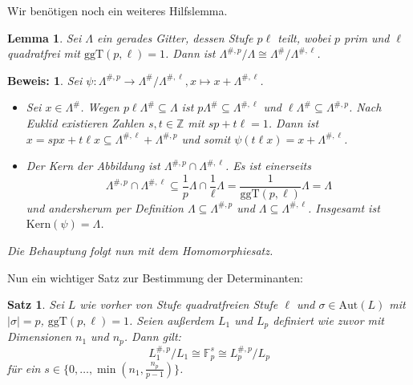 \documentclass[12pt,a4paper,halfparskip,headsepline,bibtotocnumbered]{scrreprt}
\theoremstyle{nummermitklammern}
\newtheorem{satz}[defsatzusw]{Satz}
\newtheorem{lemma}[defsatzusw]{Lemma}
\theoremstyle{nonumberbreak}
\newtheorem{beweis}{Beweis:}
\newcommand{\Z}{\mathbb{Z}}
\newcommand{\F}{\mathbb{F}}
\begin{document}
Wir benötigen noch ein weiteres Hilfslemma.

\begin{framed}
	\begin{lemma}\label{lem:quotiso}
		Sei $\Lambda$ ein gerades Gitter, dessen Stufe $p \ell$ teilt, wobei $p$ prim und $\ell$ quadratfrei mit $\text{ggT}(p, \ell) = 1$. Dann ist $\Lambda^{\#,p} / \Lambda \cong \Lambda^\# / \Lambda^{\#,\ell}$.
	\end{lemma}
\end{framed}

\begin{beweis}
	Sei $\psi:\Lambda^{\#,p} \rightarrow \Lambda^\# / \Lambda^{\#, \ell}, x \mapsto x + \Lambda^{\#, \ell}$.
	\begin{itemize}[align=left, leftmargin = *]
		\item[Surjektivität:] Sei $x \in \Lambda^\#$. Wegen $p \ell \Lambda^\# \subseteq \Lambda$ ist $p \Lambda^\# \subseteq \Lambda^{\#, \ell}$ und $\ell \Lambda^\# \subseteq \Lambda^{\#, p}$. Nach Euklid existieren Zahlen $s, t \in \Z$ mit $s p + t \ell = 1$. Dann ist $x = s p x + t \ell x \subseteq \Lambda^{\#, \ell} + \Lambda^{\#, p}$ und somit $\psi(t \ell x) = x + \Lambda^{\#, \ell}$.
		\item[Kern:] Der Kern der Abbildung ist $\Lambda^{\#, p} \cap \Lambda^{\#, \ell}$. Es ist einerseits
		\begin{equation*}
			\Lambda^{\#, p} \cap \Lambda^{\#, \ell} \subseteq \frac{1}{p} \Lambda \cap \frac{1}{\ell} \Lambda = \frac{1}{\text{ggT}(p, \ell)}\Lambda = \Lambda
		\end{equation*}
		und andersherum per Definition $\Lambda \subseteq \Lambda^{\#,p}$ und $\Lambda \subseteq \Lambda^{\#, \ell}$. Insgesamt ist\linebreak
		$\text{Kern}(\psi) = \Lambda$.
	\end{itemize}
	Die Behauptung folgt nun mit dem Homomorphiesatz.
\end{beweis}

Nun ein wichtiger Satz zur Bestimmung der Determinanten:

\begin{framed}
	\begin{satz} \label{th:fps}
		Sei $L$ wie vorher von Stufe quadratfreien Stufe $\ell$ und $\sigma \in \text{Aut}(L)$ mit $\vert \sigma \vert = p$, $\text{ggT}(p,\ell) = 1$. Seien außerdem $L_1$ und $L_p$ definiert wie zuvor mit Dimensionen $n_1$ und $n_p$. Dann gilt:
		\begin{equation*}
			L_1^{\#,p} / L_1 \cong \F_p^s \cong L_p^{\#,p} / L_p
		\end{equation*}
		für ein $s \in \lbrace 0, \dots, \min(n_1, \frac{n_p}{p-1})\rbrace$.
	\end{satz}
\end{framed}
\end{document}
